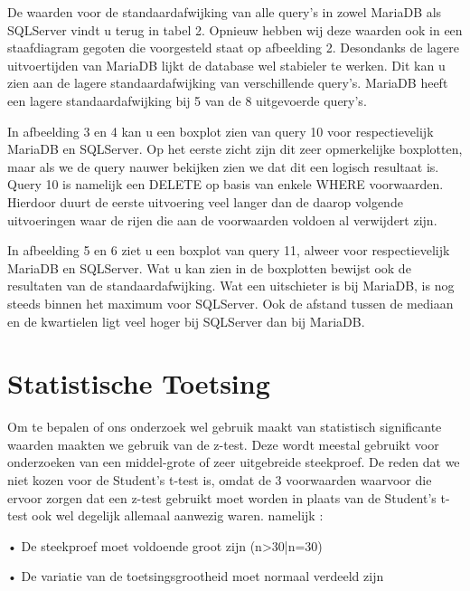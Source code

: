 \documentclass[fleqn,10pt]{artikeltin}
\begin{document}
De waarden voor de standaardafwijking van alle query’s in zowel MariaDB als SQLServer vindt u terug in tabel 2. Opnieuw hebben wij deze waarden ook in een staafdiagram gegoten die voorgesteld staat op afbeelding 2.
Desondanks de lagere uitvoertijden van MariaDB lijkt de database wel stabieler te werken. Dit kan u zien aan de lagere standaardafwijking van verschillende query’s. MariaDB heeft een lagere standaardafwijking bij 5 van de 8 uitgevoerde query’s.

In afbeelding 3 en 4 kan u een boxplot zien van query 10 voor respectievelijk MariaDB en SQLServer. Op het eerste zicht zijn dit zeer opmerkelijke boxplotten, maar als we de query nauwer bekijken zien we dat dit een logisch resultaat is. Query 10 is namelijk een DELETE op basis van enkele WHERE voorwaarden. Hierdoor duurt de eerste uitvoering veel langer dan de daarop volgende uitvoeringen waar de rijen die aan de voorwaarden voldoen al verwijdert zijn.

In afbeelding 5 en 6 ziet u een boxplot van query 11, alweer voor respectievelijk MariaDB en SQLServer. Wat u kan zien in de boxplotten bewijst ook de resultaten van de standaardafwijking. Wat een uitschieter is bij MariaDB, is nog steeds binnen het maximum voor SQLServer. Ook de afstand tussen de mediaan en de kwartielen ligt veel hoger bij SQLServer dan bij MariaDB.

\section{Statistische Toetsing}
\label{sec:statistische toetsing}
Om te bepalen of ons onderzoek wel gebruik maakt van statistisch significante waarden maakten we gebruik van de z-test. Deze wordt meestal gebruikt voor onderzoeken van een middel-grote of zeer uitgebreide steekproef. De reden dat we niet kozen voor de Student's t-test is, omdat de 3 voorwaarden waarvoor die ervoor zorgen dat een z-test gebruikt moet worden in plaats van de Student's t-test ook wel degelijk allemaal aanwezig waren. namelijk : 

\vspace{10mm} %

•  De steekproef moet voldoende groot zijn (n>30|n=30)

\vspace{5mm} %

•  De variatie van de toetsingsgrootheid moet normaal verdeeld zijn

\vspace{5mm} %
\end{document}
